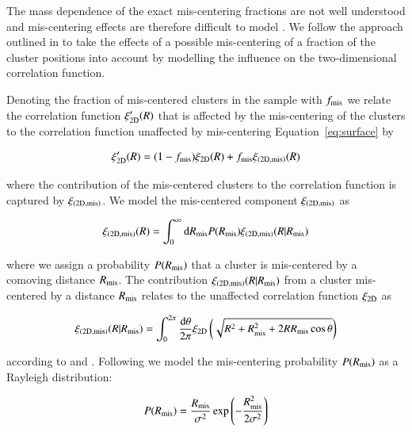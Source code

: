 \documentclass[iop, apjl, twocolappendix, numberedappendix]{emulateapj}
\begin{document}
The mass dependence of the exact mis-centering fractions are not
well understood and mis-centering effects are therefore difficult to 
model \citep{Skibba:2011, Hoshino:2015}. We follow the approach outlined 
in \citet{baxter2017halo} to take the effects of a possible mis-centering of a fraction 
of the cluster positions into account by modelling the influence on the two-dimensional correlation function.
 
Denoting the fraction of mis-centered clusters in the sample with $f_{\rm mis}$ we relate
the correlation function $\xi'_{\rm 2D}(R)$ that is affected by the mis-centering of the clusters to the correlation function
unaffected by mis-centering Equation~\ref{eq:surface} by

\begin{equation} 
\xi'_{\rm 2D}(R) = (1-f_{\rm mis})\xi_{\rm 2D}(R)+f_{\rm mis}\xi_{\rm (2D,mis)}(R)
\label{eq:full}
\end{equation}

where the contribution of the mis-centered clusters to the correlation function is captured by $\xi_{\rm (2D,mis)}$. 
We model the mis-centered component $\xi_{\rm (2D,mis)}$ as
 
\begin{equation}
\xi_{\rm (2D,mis)}(R)=\int_0^\infty \mathrm{d}R_{\rm mis} P(R_{\rm mis})\xi_{\rm (2D,mis)}(R|R_{\rm mis})
\end{equation}

where we assign a probability $P(R_{\rm mis})$ that a cluster is mis-centered by a comoving distance $R_{\rm mis}$.
The contribution $\xi_{\rm (2D,mis)}(R|R_{\rm mis})$ from a cluster mis-centered by a distance $R_{\rm mis}$ 
relates to the unaffected correlation function $\xi_{\rm 2D}$ as

\begin{equation}
\xi_{\rm (2D,mis)}(R|R_{\rm mis})=\int_0^{2\pi}\frac{\mathrm{d}\theta}{2\pi}\xi_{\rm 2D}\left(\sqrt{R^2+R_{\rm mis}^2+2RR_{\rm mis}\cos{\theta}}\right)
\end{equation}

according to \citet{yang2006weak} and \citet{johnston2007cross}. Following \citet{simet2016weak} we model the mis-centering probability 
$P(R_{\rm mis})$ as a Rayleigh distribution:

\begin{equation}
P(R_{\rm mis})=\frac{R_{\rm mis}}{\sigma^2}\exp{\left( -\frac{R_{\rm mis}^2}{2\sigma^2}\right)}
\end{equation}
\end{document}
